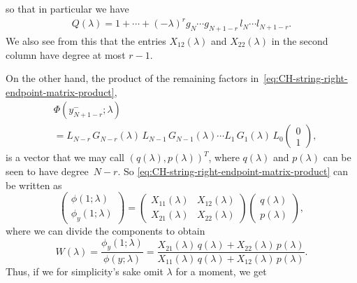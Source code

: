 \documentclass[10pt,a4paper]{article} \pdfoutput=1 
\begin{document}
so that in particular we have
\begin{equation}
  \label{eq:CH-pade-first-Q-highest-coeff}
  \begin{split}
    Q(\lambda)
    = 1 + \cdots
    + (-\lambda)^{r} g_{N} \dotsm g_{N+1-r} \, l_{N} \dotsm l_{N+1-r}
    .
  \end{split}
\end{equation}
We also see from this that the entries $X_{12}(\lambda)$ and $X_{22}(\lambda)$
in the second column have degree at most $r-1$.

On the other hand, the product of the remaining factors
in~\eqref{eq:CH-string-right-endpoint-matrix-product},
\begin{equation*}
  \begin{split}
    & \Phi(y_{N+1-r}^-;\lambda)
    \\ &
    = L_{N-r} \, G_{N-r}(\lambda) \, L_{N-1} \, G_{N-1}(\lambda) \dotsm L_1 \, G_1(\lambda) \, L_0
    \begin{pmatrix} 0 \\ 1 \end{pmatrix}
    ,
  \end{split}
\end{equation*}
is a vector that we may call $(q(\lambda),p(\lambda))^T$,
where $q(\lambda)$ and $p(\lambda)$ can be seen to have degree~$N-r$.
So \eqref{eq:CH-string-right-endpoint-matrix-product} can be written as
\begin{equation*}
  \begin{pmatrix}
    \phi(1;\lambda) \\
    \phi_y(1;\lambda)
  \end{pmatrix}
  =
  \begin{pmatrix}
    X_{11}(\lambda) & X_{12}(\lambda) \\
    X_{21}(\lambda) & X_{22}(\lambda)
  \end{pmatrix}
  \begin{pmatrix} q(\lambda) \\ p(\lambda) \end{pmatrix}
  ,
\end{equation*}
where we can divide the components to obtain
\begin{equation*}
  W(\lambda) = \frac{\phi_y(1;\lambda)}{\phi(y;\lambda)}
  = \frac{X_{21}(\lambda) \, q(\lambda) + X_{22}(\lambda) \, p(\lambda)}{X_{11}(\lambda) \, q(\lambda) + X_{12}(\lambda) \, p(\lambda)}
  .
\end{equation*}
Thus, if we for simplicity's sake omit $\lambda$ for a moment, we get
\end{document}
